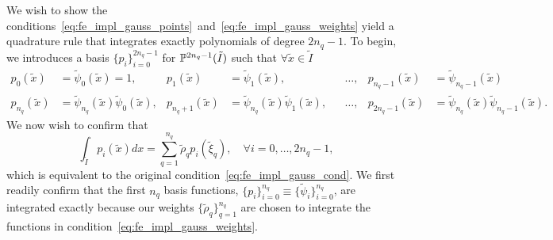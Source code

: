 We wish to show the conditions~\eqref{eq:fe_impl_gauss_points}~and~\eqref{eq:fe_impl_gauss_weights} yield a quadrature rule that integrates exactly polynomials of degree $2n_q-1$. To begin, we introduces a basis $\{p_i\}_{i=0}^{2n_q-1}$ for $\mathbb{P}^{2n_q-1}(\tilde I)$ such that $\forall \tilde x \in \tilde I$
\begin{align*}
  p_0(\tilde x) &= \tilde \psi_0(\tilde x) = 1, &
  p_1(\tilde x) &= \tilde \psi_1(\tilde x), &
  &\dots, &
  p_{n_q-1}(\tilde x) &= \tilde \psi_{n_q-1}(\tilde x) \\
  p_{n_q}(\tilde x) &= \tilde \psi_{n_q}(\tilde x) \tilde \psi_0(\tilde x), & 
  p_{n_q+1}(\tilde x) &= \tilde \psi_{n_q}(\tilde x) \tilde \psi_1(\tilde x), &  
  &\dots, &
  p_{2n_q-1}(\tilde x) &= \tilde \psi_{n_q}(\tilde x) \tilde \psi_{n_q-1}(\tilde x) .
\end{align*}
We now wish to confirm that
\begin{equation}
  \int_{\tilde I} p_i(\tilde x) dx = \sum_{q=1}^{n_q} \tilde \rho_q p_i(\tilde \xi_q), \quad \forall i = 0,\dots,2 n_q - 1,
  \label{eq:fe_impl_gauss_cond_2}
\end{equation}
which is equivalent to the original condition~\eqref{eq:fe_impl_gauss_cond}. We first readily confirm that the first $n_q$ basis functions, $\{p_i\}_{i=0}^{n_q} \equiv \{ \tilde \psi_i \}_{i=0}^{n_q}$, are integrated exactly because our weights $\{ \tilde \rho_q \}_{q=1}^{n_q}$ are chosen to integrate the functions in condition~\eqref{eq:fe_impl_gauss_weights}. 

